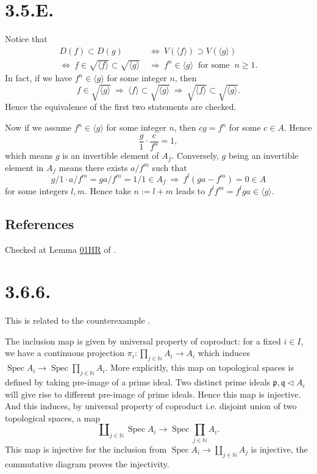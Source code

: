 \section{3.5.E.}\label{3.5.E.}

Notice that 
\begin{align*}
	D(f) \subset D(g) &~\Leftrightarrow~ V(\langle f\rangle)\supset V(\langle g\rangle)\\
	\Leftrightarrow~ f\in \sqrt{\langle f\rangle}\subset \sqrt{\langle g\rangle} &~\Rightarrow~ f^n\in\langle g\rangle ~\text{ for some }~ n\geq 1.
\end{align*}In fact, if we have $f^n\in \langle g\rangle$ for some integer $n$, then \[f\in \sqrt{\langle g\rangle} ~\Rightarrow~ \langle f\rangle \subset \sqrt{\langle g\rangle} ~\Rightarrow~ \sqrt{\langle f\rangle}\subset\sqrt{\langle g\rangle}.\] Hence the equivalence of the first two statements are checked. 

Now if we assume $f^n\in\langle g\rangle$ for some integer $n$, then $cg=f^n$ for some $c\in A$. Hence 
\[\frac{g}{1}\cdot \frac{c}{f^n}=1,\] which means $g$ is an invertible element of $A_f$. Conversely, $g$ being an invertible element in $A_f$ means there exists $a/f^m$ such that 
\[g/1\cdot a/f^m=ga/f^m=1/1\in A_f ~\Rightarrow~ f^{l}(ga-f^m)=0\in A\] for some integers $l,m$. Hence take $n:=l+m$ leads to $f^lf^m=f^lga\in \langle g\rangle$.

\subsection{References}

Checked at Lemma \href{https://stacks.math.columbia.edu/tag/01HR}{01HR} of \cite{stacks-project}.


\section{3.6.6.}


This is related to the counterexample .

The inclusion map is given by universal property of coproduct:
for a fixed $i\in I$, we have a continuous projection $\pi_i:\prod_{j\in\mathbb N}A_i\to A_i$ which induces $\operatorname{Spec}A_i\to \operatorname{Spec}\prod_{j\in\mathbb N}A_i$. More explicitly, this map on topological spaces is defined by taking pre-image of a prime ideal. Two distinct prime ideals $\mathfrak p,\mathfrak q\triangleleft A_i$ will give rise to different pre-image of prime ideals. Hence this map is injective. And this induces, by universal property of coproduct i.e. disjoint union of two topological spaces, a map \[\amalg_{j\in\mathbb N}\operatorname{Spec}A_i \to \operatorname{Spec}\prod_{j\in\mathbb N}A_i.\] This map is injective for the inclusion from $\operatorname{Spec}A_i\to\amalg_{j\in\mathbb N}A_j$ is injective, the commutative diagram proves the injectivity.

